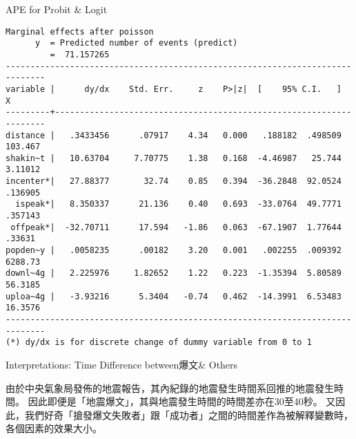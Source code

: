 \begin{frame}[fragile]{APE for Probit \& Logit}

\lstset{basicstyle=\tiny,style=myCustomMatlabStyle}

\begin{lstlisting}
Marginal effects after poisson
      y  = Predicted number of events (predict)
         =  71.157265
------------------------------------------------------------------------------
variable |      dy/dx    Std. Err.     z    P>|z|  [    95% C.I.   ]      X
---------+--------------------------------------------------------------------
distance |   .3433456      .07917    4.34   0.000   .188182  .498509   103.467
shakin~t |   10.63704     7.70775    1.38   0.168  -4.46987   25.744   3.11012
incenter*|   27.88377       32.74    0.85   0.394  -36.2848  92.0524   .136905
  ispeak*|   8.350337      21.136    0.40   0.693  -33.0764  49.7771   .357143
 offpeak*|  -32.70711      17.594   -1.86   0.063  -67.1907  1.77644    .33631
popden~y |   .0058235      .00182    3.20   0.001   .002255  .009392   6288.73
downl~4g |   2.225976     1.82652    1.22   0.223  -1.35394  5.80589   56.3185
uploa~4g |   -3.93216      5.3404   -0.74   0.462  -14.3991  6.53483   16.3576
------------------------------------------------------------------------------
(*) dy/dx is for discrete change of dummy variable from 0 to 1
\end{lstlisting}

\end{frame}

\begin{frame}[fragile]{Interpretations: Time Difference between爆文\& Others}

由於中央氣象局發佈的地震報告，其內紀錄的地震發生時間系回推的地震發生時間。
因此即便是「地震爆文」，其與地震發生時間的時間差亦在30至40秒。
又因此，我們好奇「搶發爆文失敗者」跟「成功者」之間的時間差作為被解釋變數時，各個因素的效果大小。

\end{frame}

